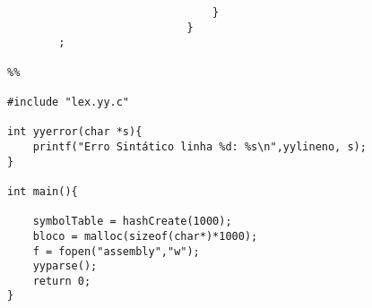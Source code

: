 \documentclass{report}
\begin{document}
\begin{verbatim}
                                }
                            }
        ;

%%

#include "lex.yy.c"

int yyerror(char *s){
    printf("Erro Sintático linha %d: %s\n",yylineno, s);
}
     
int main(){

    symbolTable = hashCreate(1000);
    bloco = malloc(sizeof(char*)*1000);
    f = fopen("assembly","w");
    yyparse(); 
    return 0; 
}

\end{verbatim}
\end{document}
